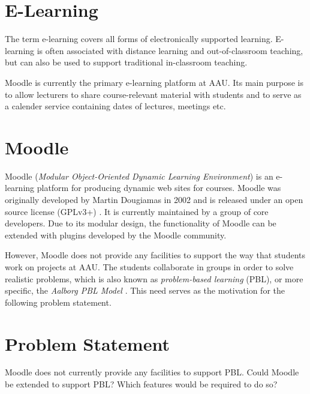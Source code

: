 \section{E-Learning}
The term e-learning covers all forms of electronically supported learning. E-learning is often associated with distance learning and out-of-classroom teaching, but can also be used to support traditional in-classroom teaching.

Moodle is currently the primary e-learning platform at AAU. Its main purpose is to allow lecturers to share course-relevant material with students and to serve as a calender service containing dates of lectures, meetings etc.

\section{Moodle}
Moodle (\emph{Modular Object-Oriented Dynamic Learning Environment}) \citep{moodle} is an e-learning platform for producing dynamic web sites for courses. Moodle was originally developed by Martin Dougiamas in 2002 and is released under an open source license (GPLv3+) \citep{gpl}. It is currently maintained by a group of core developers. Due to its modular design, the functionality of Moodle can be extended with plugins developed by the Moodle community.

However, Moodle does not provide any facilities to support the way that students work on projects at AAU. The students collaborate in groups in order to solve realistic problems, which is also known as \emph{problem-based learning} (PBL), or more specific, the \emph{Aalborg PBL Model} \citep{pbl}. This need serves as the motivation for the following problem statement.

\section{Problem Statement}
Moodle does not currently provide any facilities to support PBL. Could Moodle be extended to support PBL? Which features would be required to do so?
